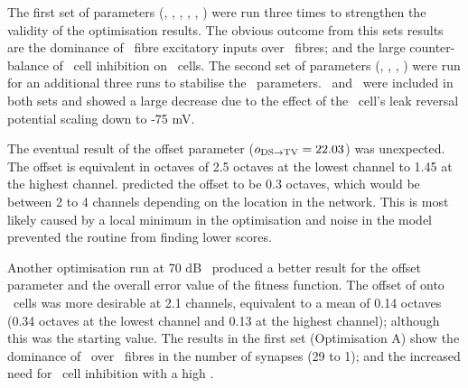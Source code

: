 The first set of parameters (\nDSTV, \wDSTV, \nLSRTV, \nHSRTV, \wLSRTV, \wHSRTV)
were run three times to strengthen the validity of the optimisation results. The
obvious outcome from this sets results are the dominance of \LSR~fibre
excitatory inputs over \HSR~fibres; and the large counter-balance of \DS~cell
inhibition on \TV~cells. The second set of parameters (\sDSTV, \Eleak
\oDSTV, \nDSTV, \wDSTV) were run for an additional three runs to stabilise the
\DSTV~parameters.  \nDSTV~and \wDSTV~were included in both sets and showed a
large decrease due to the effect of the \TV~cell's leak reversal potential
\Eleak scaling down to -75 mV\@.


The eventual result of the offset parameter ($\protect o_{\protect\textrm{{DS}}\to\textrm{{TV}}} = 22.03$) was
unexpected. The offset is equivalent in octaves of 2.5 octaves at the lowest
channel to 1.45 at the highest channel. \citet{ReissYoung:2005} predicted the
offset to be 0.3 octaves, which would be between 2 to 4 channels depending on
the location in the network. This is most likely caused by a local minimum in
the optimisation and noise in the model prevented the routine from finding lower
scores.


Another optimisation run at 70 dB \SPL~produced a better result for the offset
parameter and the overall error value of the fitness function.  The offset of
\DS onto \TV~cells was more desirable at 2.1 channels, equivalent to a mean of
0.14 octaves (0.34 octaves at the lowest channel and 0.13 at the highest
channel); although this was the starting value.  The results in the first set
(Optimisation A) show the dominance of \LSR~over \HSR~fibres in the number of
synapses (29 to 1); and the increased need for \DS~cell inhibition with a high
\nDSTV.

